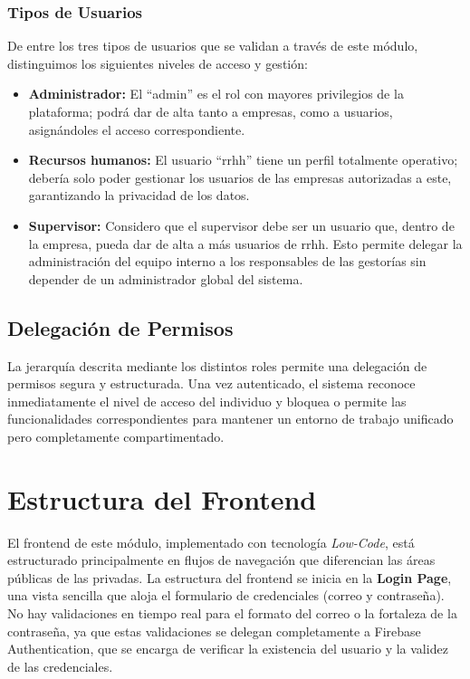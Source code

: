 \subsubsection{Tipos de Usuarios} De entre los tres tipos de usuarios que se validan a través de este módulo, distinguimos los siguientes niveles de acceso y gestión: \begin{itemize} \item \textbf{Administrador:} El “admin” es el rol con mayores privilegios de la plataforma; podrá dar de alta tanto a empresas, como a usuarios, asignándoles el acceso correspondiente. \item \textbf{Recursos humanos:} El usuario “rrhh” tiene un perfil totalmente operativo; debería solo poder gestionar los usuarios de las empresas autorizadas a este, garantizando la privacidad de los datos. \item \textbf{Supervisor:} Considero que el supervisor debe ser un usuario que, dentro de la empresa, pueda dar de alta a más usuarios de rrhh. Esto permite delegar la administración del equipo interno a los responsables de las gestorías sin depender de un administrador global del sistema. \end{itemize}

\subsection{Delegación de Permisos} La jerarquía descrita mediante los distintos roles permite una delegación de permisos segura y estructurada. Una vez autenticado, el sistema reconoce inmediatamente el nivel de acceso del individuo y bloquea o permite las funcionalidades correspondientes para mantener un entorno de trabajo unificado pero completamente compartimentado.

\section{Estructura del Frontend}
El frontend de este módulo, implementado con tecnología \textit{Low-Code}, está estructurado principalmente en flujos de navegación que diferencian las áreas públicas de las privadas. La estructura del frontend se inicia en la \textbf{Login Page}, una vista sencilla que aloja el formulario de credenciales (correo y contraseña). No hay validaciones en tiempo real para el formato del correo o la fortaleza de la contraseña, ya que estas validaciones se delegan completamente a Firebase Authentication, que se encarga de verificar la existencia del usuario y la validez de las credenciales.

